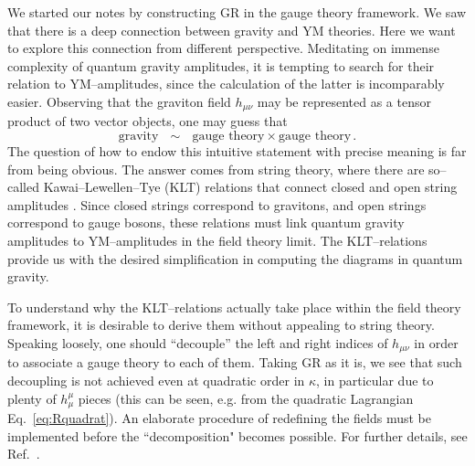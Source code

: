 \documentclass[11pt,a4paper]{article}
\newcommand{\be}{\begin{equation}}
\newcommand{\ee}{\end{equation}}
\begin{document}
We started our notes by constructing GR in the gauge theory framework. We saw that there is a deep connection between gravity and YM theories. Here we want to explore this connection from different perspective. Meditating on immense complexity of quantum gravity amplitudes, it is tempting to search for their relation to YM--amplitudes, since the calculation of the latter is incomparably easier. Observing that the graviton field $h_{\mu\nu}$ may be represented as a tensor product of two vector objects, one may guess that
\be
\text{gravity}~~~\sim~~~\text{gauge theory}\times\text{gauge theory}\,.
\ee
The question of how to endow this intuitive statement with precise meaning is far from being obvious. The answer comes from string theory, where there are so--called Kawai--Lewellen--Tye (KLT) relations that connect closed and open string amplitudes \cite{Kawai:1985xq}. Since closed strings correspond to gravitons, and open strings correspond to gauge bosons, these relations must link quantum gravity amplitudes to YM--amplitudes in the field theory limit. The KLT--relations provide us with the desired simplification in computing the diagrams in quantum gravity.

To understand why the KLT--relations actually take place within the field theory framework, it is desirable to derive them without appealing to string theory. Speaking loosely, one should ``decouple'' the left and right indices of $h_{\mu\nu}$ in order to associate a gauge theory to each of them. Taking GR as it is, we see that such decoupling is not achieved even at quadratic order in $\kappa$, in particular due to plenty of $h^\mu_\mu$ pieces (this can be seen, e.g. from the quadratic
Lagrangian Eq.~\ref{eq:Rquadrat}). An elaborate procedure of redefining the fields must be implemented before
the ``decomposition" becomes possible. For further details, see Ref.~\cite{Bern:2002kj}.
\end{document}
